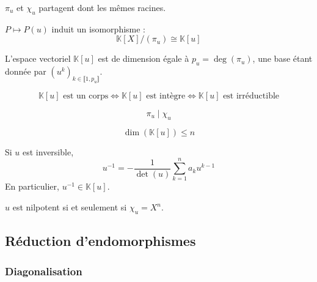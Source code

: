 
	\begin{remark}
		$\pi_u$ et $\chi_u$ partagent dont les mêmes racines.
	\end{remark}


	\begin{theorem}
		$P \mapsto P(u)$ induit un isomorphisme :
		\[ \mathbb{K}[X]/(\pi_u) \cong \mathbb{K}[u] \]
	\end{theorem}

	\begin{corollary}
		L'espace vectoriel $\mathbb{K}[u]$ est de dimension égale à $p_u = \deg(\pi_u)$, une base étant donnée par $(u^k)_{k \in \llbracket 1, p_u \rrbracket}$.
	\end{corollary}

	\begin{corollary}
		\[ \mathbb{K}[u] \text{ est un corps} \iff \mathbb{K}[u] \text{ est intègre} \iff \mathbb{K}[u] \text{ est irréductible} \]
	\end{corollary}

	\begin{theorem}
		\[ \pi_u \mid \chi_u \]
	\end{theorem}

	\begin{corollary}
		\[ \dim(\mathbb{K}[u]) \leq n \]
	\end{corollary}

	\begin{corollary}
		Si $u$ est inversible,
		\[ u^{-1} = -\frac{1}{\det(u)} \sum_{k=1}^n a_k u^{k-1} \]
		En particulier, $u^{-1} \in \mathbb{K}[u]$.
	\end{corollary}

	\begin{corollary}
		$u$ est nilpotent si et seulement si $\chi_u = X^n$.
	\end{corollary}

	\subsection{Réduction d'endomorphismes}

	\subsubsection{Diagonalisation}



